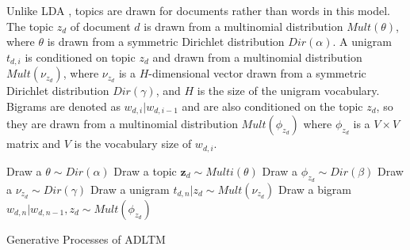 \documentclass{article}
\newcommand{\z}{\mathbf{z}}
\begin{document}
Unlike \acf{LDA} \cite{blei2003latent}, topics are drawn for documents rather than words in this model. The topic $z_d$ of document $d$ is drawn from a multinomial distribution $Mult(\theta)$, where $\theta$ is drawn from a symmetric Dirichlet distribution $Dir(\alpha)$. A unigram $t_{d,i}$ is conditioned on topic $z_d$ and drawn from a multinomial distribution $Mult(\nu_{z_d})$, where $\nu_{z_d}$ is a $H$-dimensional vector drawn from a symmetric Dirichlet distribution $Dir(\gamma)$, and $H$ is the size of the unigram vocabulary. Bigrams are denoted as $w_{d,i} | w_{d,i-1}$ and are also conditioned on the topic $z_d$, so they are drawn from a multinomial distribution $Mult(\phi_{z_d})$ where $\phi_{z_d}$ is a $V \times V$ matrix and $V$ is the vocabulary size of $w_{d,i}$. 

\begin{algorithm}[!t]
    Draw a  $\theta \sim Dir(\alpha)$\;
    {
        Draw a topic $\z_d \sim Multi(\theta)$\;
        Draw a $\phi_{z_d} \sim Dir(\beta)$\;
        Draw a $\nu_{z_d} \sim Dir(\gamma)$\;
        {
            Draw a unigram $t_{d,n} | z_d  \sim Mult(\nu_{z_d})$\;
            {
                Draw a bigram $w_{d,n} | w_{d,n-1}, z_d  \sim Mult(\phi_{z_d})$\;
            }
        }
    }
 \caption{Generative Processes of \ac{ADLTM}}
 \label{alg:adl_tm}
\end{algorithm}
\end{document}
